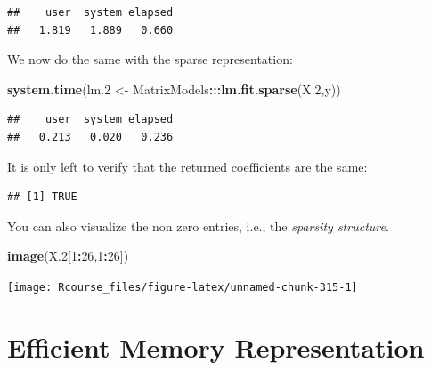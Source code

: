 \documentclass[]{book}
\newenvironment{Shaded}{\begin{snugshade}}{\end{snugshade}}
\newcommand{\DataTypeTok}[1]{\textcolor[rgb]{0.13,0.29,0.53}{#1}}
\newcommand{\DecValTok}[1]{\textcolor[rgb]{0.00,0.00,0.81}{#1}}
\newcommand{\FloatTok}[1]{\textcolor[rgb]{0.00,0.00,0.81}{#1}}
\newcommand{\KeywordTok}[1]{\textcolor[rgb]{0.13,0.29,0.53}{\textbf{#1}}}
\newcommand{\NormalTok}[1]{#1}
\newcommand{\OperatorTok}[1]{\textcolor[rgb]{0.81,0.36,0.00}{\textbf{#1}}}
\newcommand{\StringTok}[1]{\textcolor[rgb]{0.31,0.60,0.02}{#1}}
\theoremstyle{definition}
\theoremstyle{definition}
\theoremstyle{definition}
\theoremstyle{remark}
\begin{document}
\begin{verbatim}
##    user  system elapsed 
##   1.819   1.889   0.660
\end{verbatim}

We now do the same with the sparse representation:

\begin{Shaded}
\begin{Highlighting}[]
\KeywordTok{system.time}\NormalTok{(lm}\FloatTok{.2}\NormalTok{ <-}\StringTok{ }\NormalTok{MatrixModels}\OperatorTok{:::}\KeywordTok{lm.fit.sparse}\NormalTok{(X}\FloatTok{.2}\NormalTok{,y))}
\end{Highlighting}
\end{Shaded}

\begin{verbatim}
##    user  system elapsed 
##   0.213   0.020   0.236
\end{verbatim}

It is only left to verify that the returned coefficients are the same:

\begin{Shaded}
\end{Shaded}

\begin{verbatim}
## [1] TRUE
\end{verbatim}

You can also visualize the non zero entries, i.e., the \emph{sparsity structure}.

\begin{Shaded}
\begin{Highlighting}[]
\KeywordTok{image}\NormalTok{(X}\FloatTok{.2}\NormalTok{[}\DecValTok{1}\OperatorTok{:}\DecValTok{26}\NormalTok{,}\DecValTok{1}\OperatorTok{:}\DecValTok{26}\NormalTok{])}
\end{Highlighting}
\end{Shaded}

\texttt{[image: Rcourse\_files/figure-latex/unnamed-chunk-315-1]}

\hypertarget{efficient-memory-representation}{%
\section{Efficient Memory Representation}\label{efficient-memory-representation}}
\end{document}
